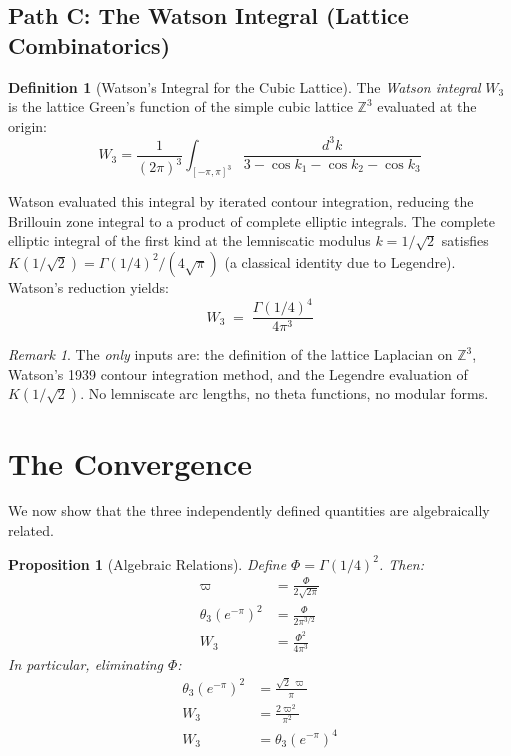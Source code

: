 \documentclass[12pt]{article}
\newtheorem{proposition}[theorem]{Proposition}
\theoremstyle{definition}
\newtheorem{definition}[theorem]{Definition}
\theoremstyle{remark}
\newtheorem{remark}[theorem]{Remark}
\begin{document}
\subsection{Path C: The Watson Integral (Lattice Combinatorics)}

\begin{definition}[Watson's Integral for the Cubic Lattice]
\label{def:watson}
The \emph{Watson integral} $W_3$ is the lattice Green's function of the simple cubic lattice $\mathbb{Z}^3$ evaluated at the origin:
\begin{equation}
    W_3 = \frac{1}{(2\pi)^3}\!\int_{[-\pi,\pi]^3}\!\!\frac{d^3k}{3 - \cos k_1 - \cos k_2 - \cos k_3}
\end{equation}
\end{definition}

Watson \cite{watson1939} evaluated this integral by iterated contour integration, reducing the Brillouin zone integral to a product of complete elliptic integrals. The complete elliptic integral of the first kind at the lemniscatic modulus $k = 1/\sqrt{2}$ satisfies $K(1/\sqrt{2}) = \Gamma(1/4)^2/(4\sqrt{\pi})$ (a classical identity due to Legendre). Watson's reduction yields:
\begin{equation}
    \boxed{\;W_3 \;=\; \frac{\Gamma(1/4)^4}{4\pi^3}\;}
    \label{eq:watson}
\end{equation}

\begin{remark}
The \emph{only} inputs are: the definition of the lattice Laplacian on $\mathbb{Z}^3$, Watson's 1939 contour integration method, and the Legendre evaluation of $K(1/\sqrt{2})$. No lemniscate arc lengths, no theta functions, no modular forms.
\end{remark}

\section{The Convergence}
\label{sec:convergence}

We now show that the three independently defined quantities are algebraically related.

\begin{proposition}[Algebraic Relations]
\label{prop:verified}
Define $\Phi = \Gamma(1/4)^2$. Then:
\begin{align}
    \varpi &= \frac{\Phi}{2\sqrt{2\pi}} \label{eq:v1}\\[4pt]
    \theta_3(e^{-\pi})^2 &= \frac{\Phi}{2\pi^{3/2}} \label{eq:v2}\\[4pt]
    W_3 &= \frac{\Phi^2}{4\pi^3} \label{eq:v3}
\end{align}
In particular, eliminating $\Phi$:
\begin{align}
    \theta_3(e^{-\pi})^2 &= \frac{\sqrt{2}\,\varpi}{\pi} \label{eq:cross1}\\[4pt]
    W_3 &= \frac{2\varpi^2}{\pi^2} \label{eq:cross2}\\[4pt]
    W_3 &= \theta_3(e^{-\pi})^4 \label{eq:cross3}
\end{align}
\end{proposition}
\end{document}
